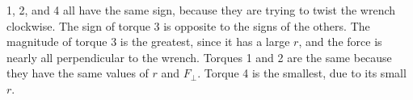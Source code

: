 1, 2, and 4 all have the same sign, because they are trying to twist the
wrench clockwise. The sign of torque 3 is opposite to the signs of the
others. The magnitude of torque 3 is the greatest, since it has a large
$r$, and the force is nearly all perpendicular to the wrench. Torques
1 and 2 are the same because they have the same values of $r$ and
$F_\perp$. Torque 4 is the smallest, due to its small $r$.
